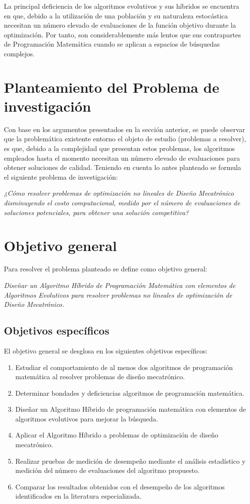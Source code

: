 La principal deficiencia de los algoritmos evolutivos y sus híbridos se encuentra en que, debido a la utilización de una población y su naturaleza estocástica necesitan un número elevado de evaluaciones de la función objetivo durante la optimización. Por tanto, son considerablemente más lentos que sus contrapartes de Programación Matemática cuando se aplican a espacios de búsquedas complejos. 
\section{Planteamiento del Problema de investigación}
  
Con base en los argumentos presentados en la sección anterior, se puede observar que la problemática existente entorno el objeto de estudio (problemas a resolver), es que, debido a la complejidad que presentan estos problemas, los algoritmos empleados hasta el momento necesitan un número elevado de evaluaciones para obtener soluciones de calidad. Teniendo en cuenta lo antes planteado se formula el siguiente problema de investigación:

  \textit{¿Cómo resolver problemas de optimización no lineales de Diseño Mecatrónico disminuyendo el costo computacional, medido por el número de evaluaciones de soluciones potenciales, para obtener una solución competitiva?}
  \section{Objetivo general}
  Para resolver el problema planteado se define como objetivo general:
  
  
 \textit{ Diseñar un Algoritmo Híbrido de Programación Matemática con elementos de Algoritmos Evolutivos  para resolver problemas no lineales de optimización de  Diseño Mecatrónico.} 
  \subsection{Objetivos específicos}
  El objetivo general se desglosa en los siguientes objetivos específicos:
  \begin{enumerate}
  	\item	Estudiar el comportamiento de al menos dos algoritmos de programación matemática al resolver problemas de diseño mecatrónico.
  	\item	Determinar bondades y deficiencias algoritmos de programación matemática.
  	\item	Diseñar un Algoritmo Híbrido de programación matemática con elementos de algoritmos evolutivos para mejorar la búsqueda.
  	\item	Aplicar el Algoritmo Híbrido a problemas de optimización de diseño mecatrónico.
  	\item	Realizar pruebas de medición de desempeño mediante el análisis estadístico y medición del número de evaluaciones del algoritmo propuesto.
  	\item	Comparar los resultados obtenidos con el desempeño de los algoritmos identificados en la literatura especializada.
  \end{enumerate}
  
